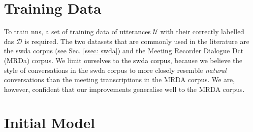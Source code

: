 

    \section{Training Data}
    To train \glspl{nn}, a set of training data of \glspl{utterance} $\mathcal{U}$ with their correctly labelled \glspl{da} $\mathcal{D}$ is required. The two datasets that are commonly used in the literature are the \gls{swda} corpus\cite{swda} (see Sec. \ref{ssec: swda}) and the Meeting Recorder Dialogue Dct (MRDa) corpus\cite{shriberg2004icsi}. We limit ourselves to the \gls{swda} corpus, because we believe the style of conversations in the \gls{swda} corpus to more closely resemble \textit{natural} conversations than the meeting transcriptions in the MRDA corpus. We are, however, confident that our improvements generalise well to the MRDA corpus.

    \section{Initial Model \label{method: kumar model}}
    
